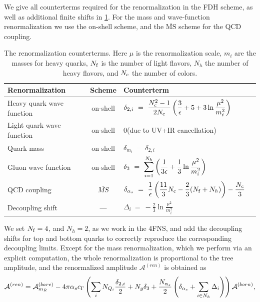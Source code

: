 We give all counterterms required for the renormalization in the FDH scheme, as well as additional finite shifts in \cref{tab:renorm}.
For the mass and wave-function renormalization we use the on-shell scheme,
and the $\overline{\text{MS}}$ scheme for the QCD coupling.
\begin{table}[h]
  \begin{tabular}{lcll}
    \toprule
    \textbf{Renormalization} & \textbf{Scheme} & \textbf{Counterterm} \\
    \midrule
    Heavy quark wave function   & on-shell & $\displaystyle \delta_{2,i} ~=~ \frac{N_\mathrm{c}^2-1}{2N_\mathrm{c}} \left( \frac{3}{\epsilon} + 5 + 3 \ln{\frac{\mu^2}{m_i^2}} \right)$\\
    Light quark wave function   & on-shell & 0\quad({\footnotesize due to UV+IR cancellation}) \\
    Quark mass            & on-shell & $\displaystyle \delta_{m_i} ~=~ \delta_{2,i}\quad\text{}$\\
    Gluon wave function   & on-shell & $\displaystyle \delta_3 ~=~ \sum_{i=1}^{N_h} \qty(\frac{1}{3\epsilon} + \frac{1}{3}\ln{\frac{\mu^2}{m_i^2}})$\\
    QCD coupling & $\overline{MS}$ & $\displaystyle \delta_{\alpha_s} ~=~ \frac{1}{\epsilon} \left( \frac{11}{3}N_\mathrm{c} - \frac{2}{3}(N_\mathrm{f}+N_h) \right) - \frac{N_\mathrm{c}}{3}$\\
    \midrule
    Decoupling shift & --- & $\displaystyle     \Delta_i ~=~  -\frac{2}{3}\ln{\frac{\mu^2}{m_i^2}} $\\
    \bottomrule
  \end{tabular}
  \caption{The renormalization counterterms. Here $\mu$ is the renormalization
    scale, $m_{i}$ are the masses for heavy quarks, $N_\mathrm{f}$ is the number of light flavors,
    $N_h$ the number of heavy flavors, and $N_\mathrm{c}$ the number of colors.
  }
  \label{tab:renorm}
\end{table}
We set $N_\mathrm{f}=4$, and $N_h=2$, as we work in the 4FNS, and 
add the decoupling shifts for top and bottom quarks to correctly reproduce the corresponding decoupling limits.
Except for the mass renormalization, which we perform via an explicit computation,
the whole renormalization is proportional to the tree amplitude, 
and the renormalized amplitude $\mathcal{A}^{(ren)}$ is
obtained as
\begin{equation}
  \mathcal{A}^{(ren)} =
  \mathcal{A}^{(bare)}_{m_R} - 4\pi \alpha_s c_\Gamma 
  \left( \sum_i N_{Q_i} \frac{\delta_{2,i}}{2} + N_{g}\delta_3 + \frac{N_{\alpha_s}}{2}\left(\delta_{\alpha_s} + \sum_{i\in N_h}\Delta_i\right) \right)  \mathcal{A}^{(born)},
  \label{renfull}
\end{equation}
